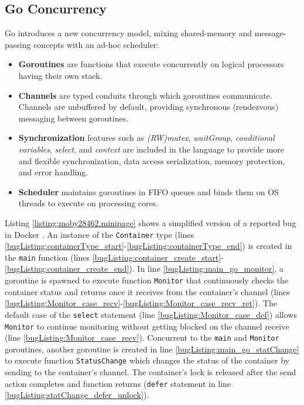 \subsection{Go Concurrency}
\label{sec:goConcurrency}
%
Go introduces a new concurrency model, mixing shared-memory and message-passing concepts with an ad-hoc scheduler:
\begin{itemize}
    \item \textbf{Goroutines} are functions that execute concurrently on logical processors having their own stack.
    \item \textbf{Channels} are typed conduits through which goroutines communicate.  Channels are unbuffered by default, providing synchronous (rendezvous) messaging between goroutines.
    \item \textbf{Synchronization} features such as \textit{(RW)mutex}, \textit{waitGroup}, \textit{conditional variables}, \textit{select}, and \textit{context} are included in the language to provide more and flexible synchronization, data access serialization, memory protection, and error handling.
    \item \textbf{Scheduler} maintains goroutines in FIFO queues and binds them on OS threads to execute on processing cores.
\end{itemize}


%

%


Listing \ref{listing:moby28462.minipage} shows a simplified version of a reported bug in Docker \cite{moby-28462-commit}.
%
An instance of the \texttt{Container} type (lines \ref{bugListing:containerType_start}-\ref{bugListing:containerType_end}) is created in the \texttt{main} function (lines \ref{bugListing:container_create_start}-\ref{bugListing:container_create_end}).
%
In line \ref{bugListing:main_go_monitor}, a goroutine is spawned to execute function \texttt{Monitor} that continuously checks the container status and returns once it receives from the container's channel (lines \ref{bugListing:Monitor_case_recv}-\ref{bugListing:Monitor_case_recv_ret}).
%
The default case of the \texttt{select} statement (line \ref{bugListing:Monitor_case_def}) allows \texttt{Monitor} to continue monitoring without getting blocked on the channel receive (line \ref{bugListing:Monitor_case_recv}).
%
Concurrent to the \texttt{main} and \texttt{Monitor} goroutines, another goroutine is created in line  \ref{bugListing:main_go_statChange} to execute function \texttt{StatusChange} which changes the status of the container by sending to the container's channel.
%
The container's lock is released after the send action completes and function returns (\texttt{defer} statement in line \ref{bugListing:statChange_defer_unlock}).
%


